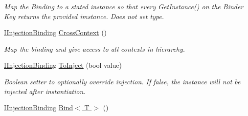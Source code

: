 \begin{DoxyCompactItemize}
\begin{DoxyCompactList}\small\item\em Map the Binding to a stated instance so that every {\ttfamily Get\-Instance()} on the Binder Key returns the provided imstance. Does not set type. \end{DoxyCompactList}\item 
\hypertarget{interfacestrange_1_1extensions_1_1injector_1_1api_1_1_i_injection_binding_a9ef8ddab4816a595f4e6db7e66be7d03}{\hyperlink{interfacestrange_1_1extensions_1_1injector_1_1api_1_1_i_injection_binding}{I\-Injection\-Binding} \hyperlink{interfacestrange_1_1extensions_1_1injector_1_1api_1_1_i_injection_binding_a9ef8ddab4816a595f4e6db7e66be7d03}{Cross\-Context} ()}\label{interfacestrange_1_1extensions_1_1injector_1_1api_1_1_i_injection_binding_a9ef8ddab4816a595f4e6db7e66be7d03}

\begin{DoxyCompactList}\small\item\em Map the binding and give access to all contexts in hierarchy. \end{DoxyCompactList}\item 
\hypertarget{interfacestrange_1_1extensions_1_1injector_1_1api_1_1_i_injection_binding_a372558a435574953af1cb6118306117d}{\hyperlink{interfacestrange_1_1extensions_1_1injector_1_1api_1_1_i_injection_binding}{I\-Injection\-Binding} \hyperlink{interfacestrange_1_1extensions_1_1injector_1_1api_1_1_i_injection_binding_a372558a435574953af1cb6118306117d}{To\-Inject} (bool value)}\label{interfacestrange_1_1extensions_1_1injector_1_1api_1_1_i_injection_binding_a372558a435574953af1cb6118306117d}

\begin{DoxyCompactList}\small\item\em Boolean setter to optionally override injection. If false, the instance will not be injected after instantiation. \end{DoxyCompactList}\item 
\hypertarget{interfacestrange_1_1extensions_1_1injector_1_1api_1_1_i_injection_binding_a69d11f853421b478500e51a1f49ce189}{\hyperlink{interfacestrange_1_1extensions_1_1injector_1_1api_1_1_i_injection_binding}{I\-Injection\-Binding} \hyperlink{interfacestrange_1_1extensions_1_1injector_1_1api_1_1_i_injection_binding_a69d11f853421b478500e51a1f49ce189}{Bind$<$ T $>$} ()}\label{interfacestrange_1_1extensions_1_1injector_1_1api_1_1_i_injection_binding_a69d11f853421b478500e51a1f49ce189}


\end{DoxyCompactItemize}
